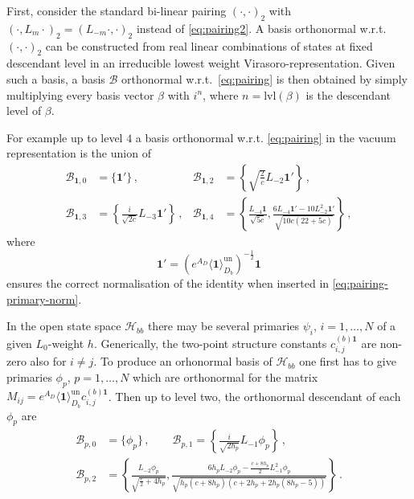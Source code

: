 \documentclass[11pt,a4paper]{article}
\numberwithin{equation}{section}
\newcommand{\one}{\mathbf{1}} %
\begin{document}
First, consider the standard bi-linear pairing $(\cdot,\cdot)_2$ with $(\cdot,L_m \cdot )_2  = (L_{-m} \cdot, \cdot )_2$ instead of \eqref{eq:pairing2}. A basis orthonormal w.r.t.\ $(\cdot,\cdot)_2$ can be constructed from real linear combinations of states at fixed descendant level in an irreducible lowest weight Virasoro-representation.
Given such a basis, a basis $\mathcal{B}$ orthonormal w.r.t.\ \eqref{eq:pairing} is then obtained by simply multiplying every basis vector $\beta$ with $i^n$, where $n = \mathrm{lvl}(\beta)$ is the descendant level of $\beta$. 

For example up to level $4$ a basis orthonormal w.r.t. \eqref{eq:pairing} in the vacuum representation is the union of 
%
\begin{align}
    \mathcal{B}_{\one,0} &= \{\one'\}\,, & \mathcal{B}_{\one,2} &= \left\{\sqrt{\frac{2}{c}} L_{-2}\one' \right\}\,,
    \nonumber \\
    \mathcal{B}_{\one,3} &= \left\{\frac{i}{\sqrt{2c}} L_{-3}\one' \right\}\,,& \mathcal{B}_{\one,4} &= \left\{\frac{L_{-4}\one}{\sqrt{5c}}  , \frac{6 L_{-4} \one' -10 L_{-2}^2 \one'}{\sqrt{10c (22+5c)}}\right\}\,,
\label{eq:BasisOne}
\end{align}
%
where 
%
\begin{equation}\label{eq:normalised-vac}
    \one' =  \left(e^{A_D}\langle \one \rangle^\mathrm{un}_{D_b}\right)^{-\frac{1}{2}} \one
\end{equation}
%
ensures the correct normalisation of the identity when inserted in \eqref{eq:pairing-primary-norm}.

In the open state space $\mathcal{H}_{bb}$ there may be several primaries $\psi_{i}$, $i=1,\dots,N$ of a given $L_0$-weight $h$. Generically, the two-point structure constants $c_{i,j}^{(b)\one}$ are non-zero also for $i\neq j$. To produce an orhonormal basis of $\mathcal{H}_{bb}$ one first has to give primaries $\phi_p$, $p=1,\dots,N$ which are orthonormal for the matrix $M_{ij} = e^{A_D} \langle \one \rangle^\mathrm{un}_{D_b} c_{i,j}^{(b)\one}$.
Then up to level two, the orthonormal descendant of each $\phi_p$ are
%
\begin{align}
    \mathcal{B}_{p,0} &= \{\phi_p\}\,, \qquad  \mathcal{B}_{p,1} = \left\{\frac{i}{\sqrt{2h_p}} L_{-1}\phi_p\right\}\,,
    \nonumber \\
    \mathcal{B}_{p,2} &= \left\{\frac{L_{-2}\phi_p}{\sqrt{\frac{c}{2}+4h_p}},\frac{6h_p L_{-2} \phi_p -\frac{c+8h_p}{2} L_{-1}^2 \phi_p}{\sqrt{h_p(c+8h_p)(c+2h_p+2h_p(8h_p-5))}}\right\}\,.
    \label{eq:BasisP}
\end{align}
\end{document}
